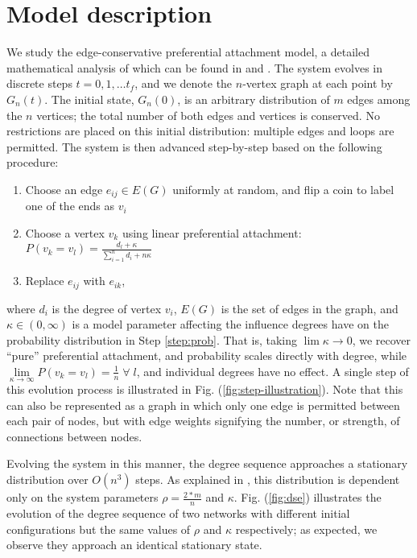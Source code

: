 \section{Model description\label{sec:m}}

We study the edge-conservative preferential attachment model, a
detailed mathematical analysis of which can be found in
\cite{rath_time_2012} and \cite{rath_multigraph_2012}.
%
The system evolves in discrete steps $t = 0,1,\ldots t_f$, and we
denote the $n$-vertex graph at each point by $G_n(t)$.
%
The initial state, $G_n(0)$, is an arbitrary distribution of $m$ edges
among the $n$ vertices; the total number of both edges and vertices is
conserved.
%
No restrictions are placed on this initial distribution: multiple
edges and loops are permitted.  The system is then advanced
step-by-step based on the following procedure:

\begin{enumerate}
\item Choose an edge $e_{ij} \in E(G)$ uniformly at random, and flip a
  coin to label one of the ends as $v_{i}$
\item Choose a vertex $v_{k}$ using linear preferential attachment:
  $P(v_{k} = v_{l}) = \frac{d_{l} + \kappa}{\sum\limits_{i=1}^{n}
    d_{i} + n \kappa}$
  \label{step:prob}
\item Replace $e_{ij}$ with $e_{ik}$,
\end{enumerate}

\noindent where $d_i$ is the degree of vertex $v_i$, $E(G)$ is the set
of edges in the graph, and $\kappa \in (0, \infty)$ is a model
parameter affecting the influence degrees have on the probability
distribution in Step \ref{step:prob}.
%
That is, taking $\lim\limits{\kappa \rightarrow 0}$, we recover
``pure'' preferential attachment, and probability scales directly with
degree, while
$\lim\limits_{\kappa \rightarrow \infty} P(v_k = v_l) = \frac{1}{n} \;
\forall \; l$, and individual degrees have no effect. A single step of
this evolution process is illustrated in
Fig. ({\ref{fig:step-illustration}}). Note that this can also be
represented as a graph in which only one edge is permitted between
each pair of nodes, but with edge weights signifying the number, or
strength, of connections between nodes.
\par

Evolving the system in this manner, the degree sequence approaches a
stationary distribution over $O(n^3)$ steps.
%
As explained in \cite{rath_time_2012}, this distribution is dependent
only on the system parameters $\rho = \frac{2*m}{n}$ and $\kappa$.
%
Fig. (\ref{fig:dse}) illustrates the evolution of the degree sequence
of two networks with different initial configurations but the same
values of $\rho$ and $\kappa$ respectively; as expected, we observe
they approach an identical stationary state.

